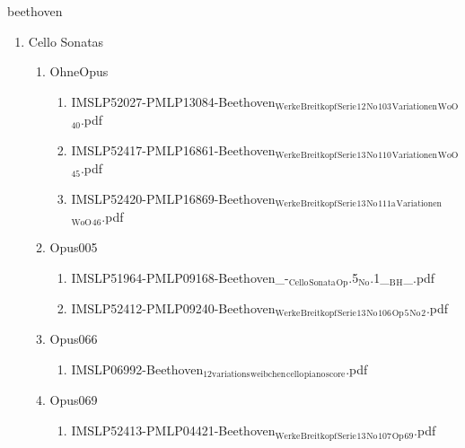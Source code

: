 \documentclass[11pt]{article}
\begin{document}
\item beethoven
\label{sec-1-1-1-1-44-9}
\begin{enumerate}
\item Cello Sonatas
\label{sec-1-1-1-1-44-9-1}
\begin{enumerate}
\item OhneOpus
\label{sec-1-1-1-1-44-9-1-1}
\begin{enumerate}
\item IMSLP52027-PMLP13084-Beethoven$_{\text{Werke}}$$_{\text{Breitkopf}}$$_{\text{Serie}}$$_{\text{12}}$$_{\text{No}}$$_{\text{103}}$$_{\text{Variationen}}$$_{\text{WoO}}$$_{\text{40}}$.pdf
\label{sec-1-1-1-1-44-9-1-1-1}

\item IMSLP52417-PMLP16861-Beethoven$_{\text{Werke}}$$_{\text{Breitkopf}}$$_{\text{Serie}}$$_{\text{13}}$$_{\text{No}}$$_{\text{110}}$$_{\text{Variationen}}$$_{\text{WoO}}$$_{\text{45}}$.pdf
\label{sec-1-1-1-1-44-9-1-1-2}

\item IMSLP52420-PMLP16869-Beethoven$_{\text{Werke}}$$_{\text{Breitkopf}}$$_{\text{Serie}}$$_{\text{13}}$$_{\text{No}}$$_{\text{111a}}$$_{\text{Variationen}}$$_{\text{WoO}}$$_{\text{46}}$.pdf
\label{sec-1-1-1-1-44-9-1-1-3}
\end{enumerate}

\item Opus005
\label{sec-1-1-1-1-44-9-1-2}
\begin{enumerate}
\item IMSLP51964-PMLP09168-Beethoven\_-$_{\text{Cello}}$$_{\text{Sonata}}$$_{\text{Op}}$.5$_{\text{No}}$.1\_$_{\text{B}}$$_{\text{H}}$\_.pdf
\label{sec-1-1-1-1-44-9-1-2-1}

\item IMSLP52412-PMLP09240-Beethoven$_{\text{Werke}}$$_{\text{Breitkopf}}$$_{\text{Serie}}$$_{\text{13}}$$_{\text{No}}$$_{\text{106}}$$_{\text{Op}}$$_{\text{5}}$$_{\text{No}}$$_{\text{2}}$.pdf
\label{sec-1-1-1-1-44-9-1-2-2}
\end{enumerate}

\item Opus066
\label{sec-1-1-1-1-44-9-1-3}
\begin{enumerate}
\item IMSLP06992-Beethoven$_{\text{12variations}}$$_{\text{weibchen}}$$_{\text{cello}}$$_{\text{piano}}$$_{\text{score}}$.pdf
\label{sec-1-1-1-1-44-9-1-3-1}
\end{enumerate}

\item Opus069
\label{sec-1-1-1-1-44-9-1-4}
\begin{enumerate}
\item IMSLP52413-PMLP04421-Beethoven$_{\text{Werke}}$$_{\text{Breitkopf}}$$_{\text{Serie}}$$_{\text{13}}$$_{\text{No}}$$_{\text{107}}$$_{\text{Op}}$$_{\text{69}}$.pdf
\label{sec-1-1-1-1-44-9-1-4-1}
\end{enumerate}


\end{enumerate}
\end{enumerate}
\end{document}
